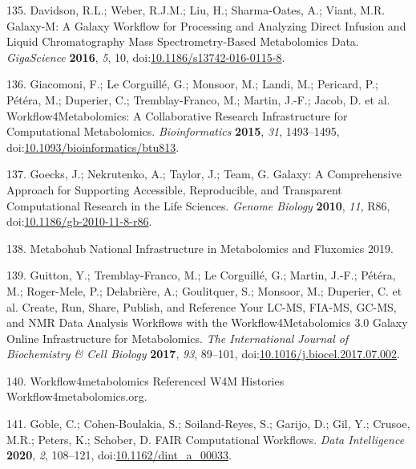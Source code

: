 \documentclass[]{article}
\begin{document}
\leavevmode\hypertarget{ref-davidson_2016}{}%
135. Davidson, R.L.; Weber, R.J.M.; Liu, H.; Sharma-Oates, A.; Viant, M.R. Galaxy-M: A Galaxy Workflow for Processing and Analyzing Direct Infusion and Liquid Chromatography Mass Spectrometry-Based Metabolomics Data. \emph{GigaScience} \textbf{2016}, \emph{5}, 10, doi:\href{https://doi.org/10.1186/s13742-016-0115-8}{10.1186/s13742-016-0115-8}.

\leavevmode\hypertarget{ref-giacomoni_2015}{}%
136. Giacomoni, F.; Le Corguillé, G.; Monsoor, M.; Landi, M.; Pericard, P.; Pétéra, M.; Duperier, C.; Tremblay-Franco, M.; Martin, J.-F.; Jacob, D. et al. Workflow4Metabolomics: A Collaborative Research Infrastructure for Computational Metabolomics. \emph{Bioinformatics} \textbf{2015}, \emph{31}, 1493--1495, doi:\href{https://doi.org/10.1093/bioinformatics/btu813}{10.1093/bioinformatics/btu813}.

\leavevmode\hypertarget{ref-goecks_2010}{}%
137. Goecks, J.; Nekrutenko, A.; Taylor, J.; Team, G. Galaxy: A Comprehensive Approach for Supporting Accessible, Reproducible, and Transparent Computational Research in the Life Sciences. \emph{Genome Biology} \textbf{2010}, \emph{11}, R86, doi:\href{https://doi.org/10.1186/gb-2010-11-8-r86}{10.1186/gb-2010-11-8-r86}.

\leavevmode\hypertarget{ref-metabohub_website_2019}{}%
138. Metabohub National Infrastructure in Metabolomics and Fluxomics 2019.

\leavevmode\hypertarget{ref-guitton_2017}{}%
139. Guitton, Y.; Tremblay-Franco, M.; Le Corguillé, G.; Martin, J.-F.; Pétéra, M.; Roger-Mele, P.; Delabrière, A.; Goulitquer, S.; Monsoor, M.; Duperier, C. et al. Create, Run, Share, Publish, and Reference Your LC-MS, FIA-MS, GC-MS, and NMR Data Analysis Workflows with the Workflow4Metabolomics 3.0 Galaxy Online Infrastructure for Metabolomics. \emph{The International Journal of Biochemistry \& Cell Biology} \textbf{2017}, \emph{93}, 89--101, doi:\href{https://doi.org/10.1016/j.biocel.2017.07.002}{10.1016/j.biocel.2017.07.002}.

\leavevmode\hypertarget{ref-workflow4metabolomics_website_nd}{}%
140. Workflow4metabolomics Referenced W4M Histories Workflow4metabolomics.org.

\leavevmode\hypertarget{ref-goble_2019}{}%
141. Goble, C.; Cohen-Boulakia, S.; Soiland-Reyes, S.; Garijo, D.; Gil, Y.; Crusoe, M.R.; Peters, K.; Schober, D. FAIR Computational Workflows. \emph{Data Intelligence} \textbf{2020}, \emph{2}, 108--121, doi:\href{https://doi.org/10.1162/dint_a_00033}{10.1162/dint\_a\_00033}.
\end{document}

